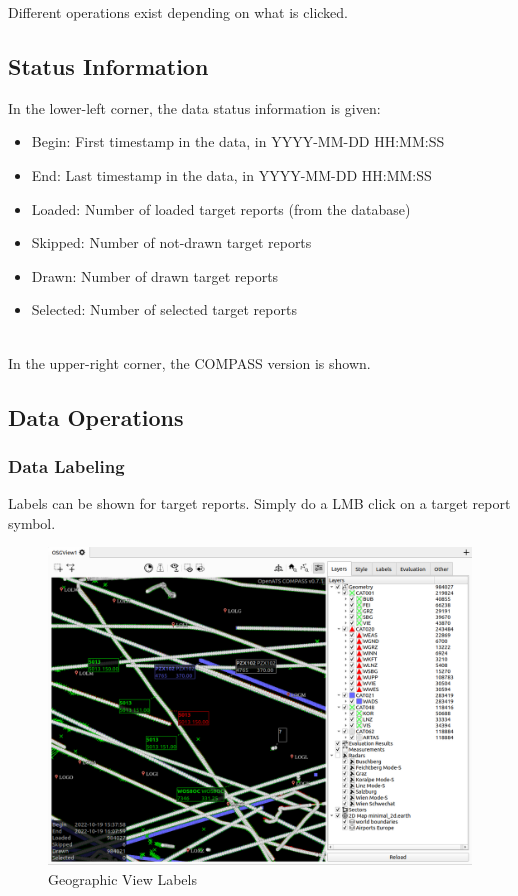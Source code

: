 Different operations exist depending on what is clicked.

\subsection{Status Information}

In the lower-left corner, the data status information is given:

\begin{itemize}
 \item Begin: First timestamp in the data, in YYYY-MM-DD HH:MM:SS
 \item End: Last timestamp in the data, in YYYY-MM-DD HH:MM:SS
 \item Loaded: Number of loaded target reports (from the database)
 \item Skipped: Number of not-drawn target reports
 \item Drawn: Number of drawn target reports
 \item Selected: Number of selected target reports
\end{itemize}
\  \\

In the upper-right corner, the COMPASS version is shown. %

\subsection{Data Operations}

\subsubsection{Data Labeling}

Labels can be shown for target reports. Simply do a LMB click on a target report symbol.

\begin{figure}[H]
    \hspace*{-2.5cm}
    \includegraphics[width=19cm,frame]{figures/geoview_labels.png}
  \caption{Geographic View Labels}
\end{figure}

